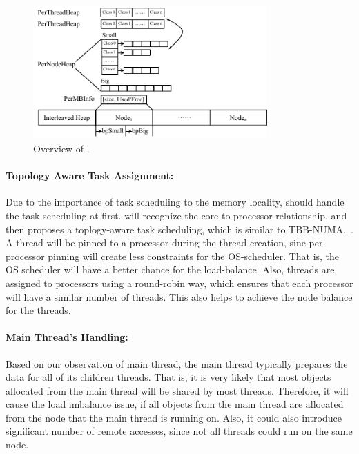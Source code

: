 \begin{figure}[h]
\begin{center}
\includegraphics[width=0.8\textwidth]{figure/heaplayout}
\end{center}
\vspace{-0.1in}
\caption{Overview of \NA{}.
\label{fig:overview}}
\vspace{-0.1in}
\end{figure}

\paragraph{Topology Aware Task Assignment:} Due to the importance of task scheduling to the memory locality, \NA{} should handle the task scheduling at first. \NA{} will recognize the core-to-processor relationship, and then proposes a toplogy-aware task scheduling, which is similar to TBB-NUMA.~\cite{Majo:2015:LPC:2688500.2688509}. A thread will be pinned to a processor during the thread creation, sine per-processor pinning will create less constraints for the OS-scheduler. That is, the OS scheduler will have a better chance for the load-balance. Also, threads are assigned to processors using a round-robin way, which ensures that each processor will have a similar number of threads. This also helps to achieve the node balance for the threads. 

\paragraph{Main Thread's Handling:} Based on our observation of main thread, the main thread typically prepares the data for all of its children threads. That is, it is very likely that most objects allocated from the main thread will be shared by most threads. Therefore, it will cause the load imbalance issue, if all objects from the main thread are allocated from the node that the main thread is running on. Also, it could also introduce significant number of remote accesses, since not all threads could run on the same node.  

